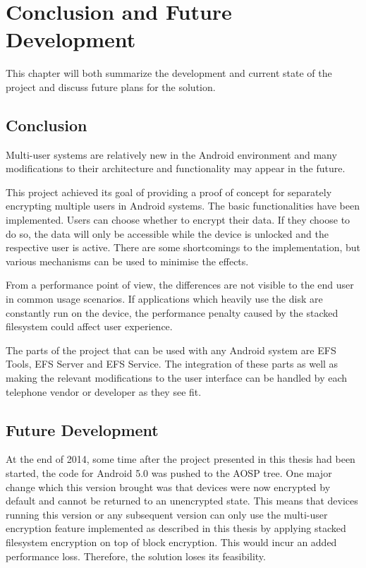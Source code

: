 \chapter{Conclusion and Future Development}
\label{chapter:conclusion-devel}

This chapter will both summarize the development and current state of the project and discuss future plans for the solution.

\section{Conclusion}
\label{sec:conclusion}

Multi-user systems are relatively new in the Android environment and many modifications to their architecture and functionality may appear in the future.

This project achieved its goal of providing a proof of concept for separately encrypting multiple users in Android systems. The basic functionalities have been implemented. Users can choose whether to encrypt their data. If they choose to do so, the data will only be accessible while the device is unlocked and the respective user is active. There are some shortcomings to the implementation, but various mechanisms can be used to minimise the effects.

From a performance point of view, the differences are not visible to the end user in common usage scenarios. If applications which heavily use the disk are constantly run on the device, the performance penalty caused by the stacked filesystem could affect user experience.

The parts of the project that can be used with any Android system are EFS Tools, EFS Server and EFS Service. The integration of these parts as well as making the relevant modifications to the user interface can be handled by each telephone vendor or developer as they see fit.

\section{Future Development}
\label{sec:future-devel}

At the end of 2014, some time after the project presented in this thesis had been started, the code for Android 5.0 was pushed to the AOSP tree. One major change which this version brought was that devices were now encrypted by default and cannot be returned to an unencrypted state\cite{andr-enc}. This means that devices running this version or any subsequent version can only use the multi-user encryption feature implemented as described in this thesis by applying stacked filesystem encryption on top of block encryption. This would incur an added performance loss. Therefore, the solution loses its feasibility.

